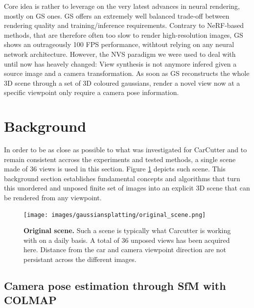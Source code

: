 Core idea is rather to leverage on the very latest advances in neural rendering, mostly on \ac{GS} ones. \ac{GS} offers an extremely well balanced trade-off between rendering quality and training/inference requirements. Contrary to \ac{NeRF}-based methods, that are therefore often too slow to render high-resolution images, \ac{GS} shows an outrageously 100 \ac{FPS} performance, withtout relying on any neural network architecture. However, the \ac{NVS} paradigm we were used to deal with until now has heavely changed: View synthesis is not anymore infered given a source image and a camera transformation. As soon as \ac{GS} reconstructs the whole 3D scene through a set of 3D coloured gaussians, render a novel view now at a specific viewpoint only require a camera pose information.


\section{Background}
In order to be as close as possible to what was investigated for CarCutter and to remain consistent accross the experiments and tested methods, a single scene made of 36 views is used in this section. Figure \ref{fig:gs-original_scene} depicts such scene. This background section establishes fundamental concepts and algorithms that turn this unordered and unposed finite set of images into an explicit 3D scene that can be rendered from any viewpoint. 

\begin{figure}[htb!]
    \center
  \texttt{[image: images/gaussiansplatting/original\_scene.png]}
  \caption{\textbf{Original scene.} Such a scene is typically what Carcutter is working with on a daily basis. A total of 36 unposed views has been acquired here. Distance from the car and camera viewpoint direction are not persistant across the different images.}
  \label{fig:gs-original_scene}
\end{figure}

\subsection{Camera pose estimation through SfM with COLMAP}
\label{subsec:gs-sfm}

